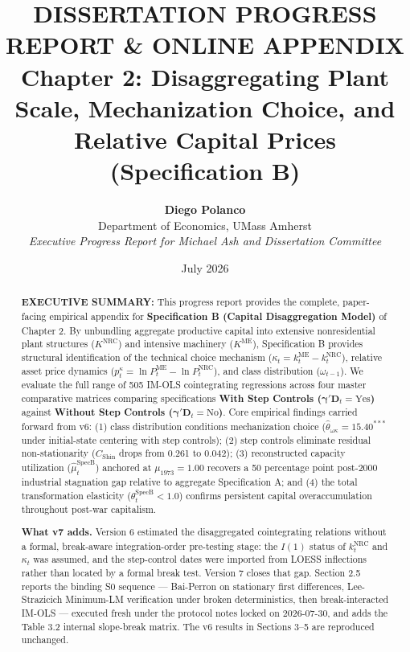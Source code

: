 \documentclass[11pt,a4paper]{article}
\title{\textbf{DISSERTATION PROGRESS REPORT \& ONLINE APPENDIX} \\[0.5em] \Large \textbf{Chapter 2: Disaggregating Plant Scale, Mechanization Choice, and Relative Capital Prices (Specification B)}}
\author{\textbf{Diego Polanco} \\ Department of Economics, UMass Amherst \\ \textit{Executive Progress Report for Michael Ash and Dissertation Committee}}
\date{July 2026}
\begin{document}
\maketitle

\begin{abstract}
\noindent \textbf{EXECUTIVE SUMMARY:} This progress report provides the complete, paper-facing empirical appendix for \textbf{Specification B (Capital Disaggregation Model)} of Chapter 2. By unbundling aggregate productive capital into extensive nonresidential plant structures ($K^{\text{NRC}}$) and intensive machinery ($K^{\text{ME}}$), Specification B provides structural identification of the technical choice mechanism ($\kappa_t = k^{\text{ME}}_t - k^{\text{NRC}}_t$), relative asset price dynamics ($p_t^{\kappa} = \ln P^{\text{ME}}_t - \ln P^{\text{NRC}}_t$), and class distribution ($\omega_{t-1}$). We evaluate the full range of 505 IM-OLS cointegrating regressions across four master comparative matrices comparing specifications \textbf{With Step Controls ($\boldsymbol{\gamma}'\mathbf{D}_t = \text{Yes}$)} against \textbf{Without Step Controls ($\boldsymbol{\gamma}'\mathbf{D}_t = \text{No}$)}. Core empirical findings carried forward from v6: (1) class distribution conditions mechanization choice ($\hat{\theta}_{\omega \kappa} = 15.40^{***}$ under initial-state centering with step controls); (2) step controls eliminate residual non-stationarity ($C_{\text{Shin}}$ drops from 0.261 to 0.042); (3) reconstructed capacity utilization ($\hat{\mu}_t^{\text{SpecB}}$) anchored at $\mu_{1973} = 1.00$ recovers a 50 percentage point post-2000 industrial stagnation gap relative to aggregate Specification A; and (4) the total transformation elasticity ($\theta_t^{\text{SpecB}} < 1.0$) confirms persistent capital overaccumulation throughout post-war capitalism.

\noindent \textbf{What v7 adds.} Version 6 estimated the disaggregated cointegrating relations without a formal, break-aware integration-order pre-testing stage: the $I(1)$ status of $k_t^{\text{NRC}}$ and $\kappa_t$ was assumed, and the step-control dates were imported from LOESS inflections rather than located by a formal break test. Version 7 closes that gap. Section 2.5 reports the binding S0\* sequence --- Bai-Perron on stationary first differences, Lee-Strazicich Minimum-LM verification under broken deterministics, then break-interacted IM-OLS --- executed fresh under the protocol notes locked on 2026-07-30, and adds the Table 3.2 internal slope-break matrix. The v6 results in Sections 3--5 are reproduced unchanged.
\end{abstract}
\end{document}
